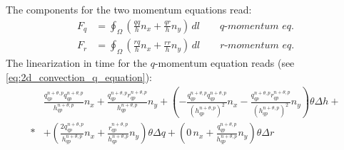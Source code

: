 The components for the two momentum equations read:
\begin{align}
    F_q
    & = \oint_{\Omega} \left(\frac{qq}{h}{n_x} + \frac{qr}{h}{n_y}\right) \, dl
    \qquad \textit{q-momentum eq.}
    \\
    F_r
    & = \oint_{\Omega} \left(\frac{rq}{h}{n_x} + \frac{rr}{h}{n_y}\right) \, dl
    \qquad \textit{r-momentum eq.}
\end{align}
%
The linearization in time for the $q$-momentum equation reads (see \autoref{eq:2d_convection_q_equation}):
\begin{align}
    &\frac{q^{n+\theta, p}_{qp}q^{n+\theta, p}_{qp}}{h^{n+\theta, p}_{qp}} n_x+ \frac{q^{n+\theta, p}_{qp}r^{n+\theta, p}_{qp}}{h^{n+\theta, p}_{qp}} n_y
    + \left( -\frac{q^{n+\theta, p}_{qp}q^{n+\theta, p}_{qp}}{(h^{n+\theta, p}_{qp})^2} n_x -
    \frac{q^{n+\theta, p}_{qp}r^{n+\theta, p}_{qp}}{(h^{n+\theta, p}_{qp})^2} n_y \right) \theta \Delta h +
    \nonumber \\*
    & + \left( \frac{2 q^{n+\theta, p}_{qp}}{h^{n+\theta, p}_{qp}} n_x +  \frac{r^{n+\theta, p}_{qp}}{h^{n+\theta, p}_{qp}} n_y \right) \theta \Delta q
    + \left( 0\, n_x + \frac{q^{n+\theta, p}_{qp}}{h^{n+\theta, p}_{qp}} n_y \right) \theta \Delta r
\end{align}
